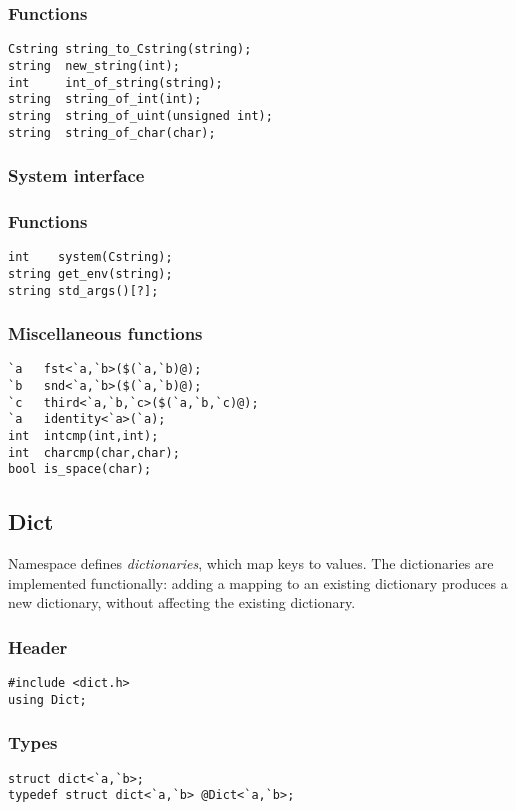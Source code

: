 \subsubsection*{Functions}
\begin{verbatim}
Cstring string_to_Cstring(string);
string  new_string(int);
int     int_of_string(string);
string  string_of_int(int);
string  string_of_uint(unsigned int);
string  string_of_char(char);
\end{verbatim}

\subsubsection*{System interface}
\subsubsection*{Functions}
\begin{verbatim}
int    system(Cstring);
string get_env(string);
string std_args()[?];
\end{verbatim}

\subsubsection*{Miscellaneous functions}
\begin{verbatim}
`a   fst<`a,`b>($(`a,`b)@);
`b   snd<`a,`b>($(`a,`b)@);
`c   third<`a,`b,`c>($(`a,`b,`c)@);
`a   identity<`a>(`a);
int  intcmp(int,int);
int  charcmp(char,char);
bool is_space(char);
\end{verbatim}

\subsection{Dict}

Namespace  defines \emph{dictionaries}, which map keys to
values.  The dictionaries are implemented functionally: adding a mapping
to an existing dictionary produces a new dictionary, without affecting
the existing dictionary.

\subsubsection*{Header}
\begin{verbatim}
#include <dict.h>
using Dict;
\end{verbatim}

\subsubsection*{Types}
\begin{verbatim}
struct dict<`a,`b>;
typedef struct dict<`a,`b> @Dict<`a,`b>;
\end{verbatim}

